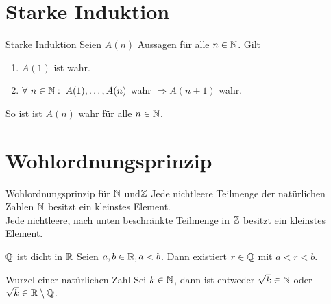 \documentclass[main.tex]{subfiles}
\begin{document}
\section*{Starke Induktion}
\begin{karte}{Starke Induktion}
    Seien \(A(n) \) Aussagen für alle \(n \in \mathbb{N} \). Gilt
	\begin{enumerate}
		\item \(A(1) \) ist wahr.
        \item \(\forall \, n \in \N: \; A(1), \ldots, A(n) \) wahr 
        \(\Rightarrow A(n + 1) \) wahr.
	\end{enumerate}
	So ist ist \(A(n) \) wahr für alle \(n \in \mathbb{N} \).
\end{karte}
\section*{Wohlordnungsprinzip}
\begin{karte}{Wohlordnungsprinzip für \( \mathbb{N} \) und\( \mathbb{Z} \)}
    Jede nichtleere Teilmenge der 
    natürlichen Zahlen \(\mathbb{N} \) 
    besitzt ein kleinstes Element.\\
    Jede nichtleere, nach unten 
    beschränkte Teilmenge in \( \mathbb{Z} \) 
    besitzt ein kleinstes Element.
\end{karte}
\begin{karte}{\(\mathbb{Q}\) ist dicht in \(\mathbb{R}\)}
    Seien \(a, b \in \mathbb{R}, a < b \). 
    Dann existiert \( r \in \mathbb{Q} \) mit \(a < r < b \).
\end{karte}
\begin{karte}{Wurzel einer natürlichen Zahl}
    Sei \(k \in \mathbb{N} \), dann ist entweder 
    \(\sqrt{k} \in \mathbb{N} \) oder \(\sqrt{k} \in \mathbb{R} \setminus \mathbb{Q} \).
\end{karte}
\end{document}
